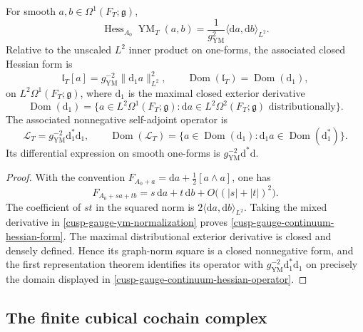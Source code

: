\begin{proposition}
\label{cusp-gauge-continuum-hessian}
For smooth
\(a,b\in\Omega^1(F_T;\mathfrak g)\),
\begin{equation}
 \operatorname{Hess}_{A_0}\operatorname{YM}_T(a,b)
 =\frac1{g_{\mathrm{YM}}^2}
 \langle\mathrm da,\mathrm db\rangle_{L^2}.
 \label{cusp-gauge-continuum-hessian-form}
\end{equation}
Relative to the unscaled \(L^2\) inner product on one-forms, the associated
closed Hessian form is
\begin{equation}
 \mathfrak l_T[a]
 =g_{\mathrm{YM}}^{-2}\lVert \mathrm d_1a\rVert_{L^2}^2,
 \qquad
 \operatorname{Dom}(\mathfrak l_T)=\operatorname{Dom}(\mathrm d_1),
 \label{cusp-gauge-continuum-closed-form}
\end{equation}
on \(L^2\Omega^1(F_T;\mathfrak g)\), where \(\mathrm d_1\) is the
maximal closed exterior derivative
\[
 \operatorname{Dom}(\mathrm d_1)
 =\{a\in L^2\Omega^1(F_T;\mathfrak g):
       \mathrm da\in L^2\Omega^2(F_T;\mathfrak g)
       \text{ distributionally}\}.
\]
The associated nonnegative self-adjoint operator is
\begin{equation}
 \mathcal L_T=g_{\mathrm{YM}}^{-2}\mathrm d_1^*\mathrm d_1,
 \qquad
 \operatorname{Dom}(\mathcal L_T)
 =\{a\in\operatorname{Dom}(\mathrm d_1):
       \mathrm d_1a\in\operatorname{Dom}(\mathrm d_1^*)\}.
 \label{cusp-gauge-continuum-hessian-operator}
\end{equation}
Its differential expression on smooth one-forms is
\(g_{\mathrm{YM}}^{-2}\mathrm d^*\mathrm d\).
\end{proposition}

\begin{proof}
With the convention
\(F_{A_0+a}=\mathrm da+\tfrac12[a\wedge a]\), one has
\[
 F_{A_0+sa+tb}
 =s\,\mathrm da+t\,\mathrm db
 +O\bigl((|s|+|t|)^2\bigr).
\]
The coefficient of \(st\) in the squared norm is
\(2\langle\mathrm da,\mathrm db\rangle_{L^2}\).  Taking the mixed
derivative in \cref{cusp-gauge-ym-normalization} proves
\cref{cusp-gauge-continuum-hessian-form}.  The maximal distributional
exterior derivative is closed and densely defined.  Hence its graph-norm
square is a closed nonnegative form, and the first representation theorem
identifies its operator with
\(g_{\mathrm{YM}}^{-2}\mathrm d_1^*\mathrm d_1\) on precisely the domain
displayed in \cref{cusp-gauge-continuum-hessian-operator}.
\end{proof}

\subsection{The finite cubical cochain complex}
\label{cusp-gauge-finite-subsection}

